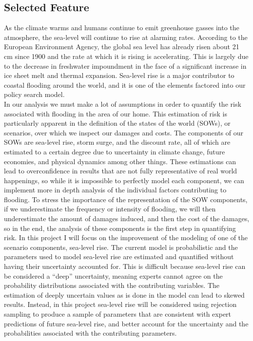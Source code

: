 \documentclass[
  11pt,
]{article}
\begin{document}
\subsection{Selected Feature}\label{selected-feature}

As the climate warms and humans continue to emit greenhouse gasses into
the atmosphere, the sea-level will continue to rise at alarming rates.
According to the European Environment Agency, the global sea level has
already risen about 21 cm since 1900 and the rate at which it is rising
is accelerating. This is largely due to the decrease in freshwater
impoundment in the face of a significant increase in ice sheet melt and
thermal expansion. Sea-level rise is a major contributor to coastal
flooding around the world, and it is one of the elements factored into
our policy search model.\\
In our analysis we must make a lot of assumptions in order to quantify
the risk associated with flooding in the area of our home. This
estimation of risk is particularly apparent in the definition of the
states of the world (SOWs), or scenarios, over which we inspect our
damages and costs. The components of our SOWs are sea-level rise, storm
surge, and the discount rate, all of which are estimated to a certain
degree due to uncertainty in climate change, future economies, and
physical dynamics among other things. These estimations can lead to
overconfidence in results that are not fully representative of real
world happenings, so while it is impossible to perfectly model each
component, we can implement more in depth analysis of the individual
factors contributing to flooding. To stress the importance of the
representation of the SOW components, if we underestimate the frequency
or intensity of flooding, we will then underestimate the amount of
damages induced, and then the cost of the damages, so in the end, the
analysis of these components is the first step in quantifying risk. In
this project I will focus on the improvement of the modeling of one of
the scenario components, sea-level rise. The current model is
probabilistic and the parameters used to model sea-level rise are
estimated and quantified without having their uncertainty accounted for.
This is difficult because sea-level rise can be considered a ``deep''
uncertainty, meaning experts cannot agree on the probability
distributions associated with the contributing variables. The estimation
of deeply uncertain values as is done in the model can lead to skewed
results. Instead, in this project sea-level rise will be considered
using rejection sampling to produce a sample of parameters that are
consistent with expert predictions of future sea-level rise, and better
account for the uncertainty and the probabilities associated with the
contributing parameters.
\end{document}
